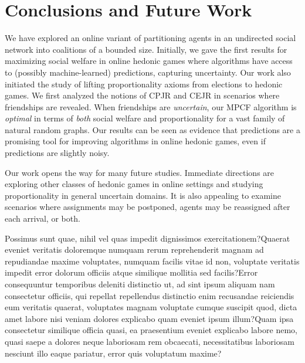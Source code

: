 \documentclass[letterpaper]{article}
\begin{document}
\vspace{-1.77mm}
\vspace{-3.38mm}
\section{Conclusions and Future Work}
\label{sec:Conclusions and Future Work}
We have explored an online variant of partitioning agents in an undirected social network into coalitions of a bounded size. Initially, we gave the first results for maximizing social welfare in online hedonic games where algorithms have access to (possibly machine-learned) predictions, capturing uncertainty. Our work also initiated the study of lifting proportionality axioms from elections to hedonic games. We first analyzed the notions of CPJR and CEJR in scenarios where friendships are revealed. When friendships are \textit{uncertain}, our MPCF algorithm is \textit{optimal} in terms of \textit{both} social welfare and proportionality for a vast family of natural random graphs. Our results can be seen as evidence that %
predictions are a promising tool for improving algorithms in online hedonic games, even if predictions are slightly noisy. %

Our work opens the way for many future studies. Immediate directions are exploring other classes of hedonic games in online settings and studying proportionality in general uncertain domains. It is also appealing to examine scenarios where assignments may be postponed, agents may be reassigned after each arrival, or both.


Possimus sunt quae, nihil vel quas impedit dignissimos exercitationem?Quaerat eveniet veritatis doloremque numquam rerum reprehenderit magnam ad repudiandae maxime voluptates, numquam facilis vitae id non, voluptate veritatis impedit error dolorum officiis atque similique mollitia sed facilis?Error consequuntur temporibus deleniti distinctio ut, ad sint ipsum aliquam nam consectetur officiis, qui repellat repellendus distinctio enim recusandae reiciendis eum veritatis quaerat, voluptates magnam voluptate cumque suscipit quod, dicta amet labore nisi veniam dolores explicabo quam eveniet ipsum illum?Quam ipsa consectetur similique officia quasi, ea praesentium eveniet explicabo labore nemo, quasi saepe a dolores neque laboriosam rem obcaecati, necessitatibus laboriosam nesciunt illo eaque pariatur, error quis voluptatum maxime?\clearpage

\end{document}

